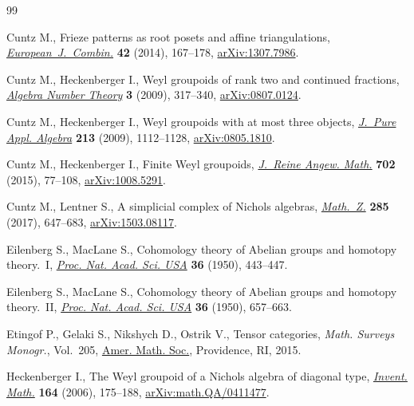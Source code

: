 \documentclass[pdftex]{sigma}
\numberwithin{equation}{section}
\begin{document}
\begin{thebibliography}{99}
\footnotesize\itemsep=0pt

Cuntz M., Frieze patterns as root posets and affine triangulations,
 \href{https://doi.org/10.1016/j.ejc.2014.06.005}{\textit{European~J.~Combin.}} \textbf{42} (2014), 167--178,
 \href{https://arxiv.org/abs/1307.7986}{arXiv:1307.7986}.

Cuntz M., Heckenberger I., Weyl groupoids of rank two and continued fractions,
 \href{https://doi.org/10.2140/ant.2009.3.317}{\textit{Algebra Number Theory}} \textbf{3} (2009), 317--340,
 \href{https://arxiv.org/abs/0807.0124}{arXiv:0807.0124}.

Cuntz M., Heckenberger I., Weyl groupoids with at most three objects,
 \href{https://doi.org/10.1016/j.jpaa.2008.11.009}{\textit{J.~Pure Appl. Algebra}} \textbf{213} (2009), 1112--1128,
 \href{https://arxiv.org/abs/0805.1810}{arXiv:0805.1810}.

Cuntz M., Heckenberger I., Finite {W}eyl groupoids, \href{https://doi.org/10.1515/crelle-2013-0033}{\textit{J.~Reine Angew.
 Math.}} \textbf{702} (2015), 77--108, \href{https://arxiv.org/abs/1008.5291}{arXiv:1008.5291}.

Cuntz M., Lentner S., A simplicial complex of {N}ichols algebras,
 \href{https://doi.org/10.1007/s00209-016-1711-0}{\textit{Math.~Z.}} \textbf{285} (2017), 647--683, \href{https://arxiv.org/abs/1503.08117}{arXiv:1503.08117}.

Eilenberg S., MacLane S., Cohomology theory of {A}belian groups and homotopy
 theory.~{I}, \href{https://doi.org/10.1073/pnas.36.8.443}{\textit{Proc. Nat. Acad. Sci. USA}} \textbf{36} (1950), 443--447.

Eilenberg S., MacLane S., Cohomology theory of {A}belian groups and homotopy
 theory.~{II}, \href{https://doi.org/10.1073/pnas.36.11.657}{\textit{Proc. Nat. Acad. Sci. USA}} \textbf{36} (1950),
 657--663.

Etingof P., Gelaki S., Nikshych D., Ostrik V., Tensor categories, \textit{Math.
 Surveys Monogr.}, Vol.~205, \href{https://doi.org/10.1090/surv/205}{Amer. Math. Soc.}, Providence, RI, 2015.

Heckenberger I., The {W}eyl groupoid of a {N}ichols algebra of diagonal type,
 \href{https://doi.org/10.1007/s00222-005-0474-8}{\textit{Invent. Math.}} \textbf{164} (2006), 175--188,
 \href{https://arxiv.org/abs/math.QA/0411477}{arXiv:math.QA/0411477}.


\end{thebibliography}
\end{document}
